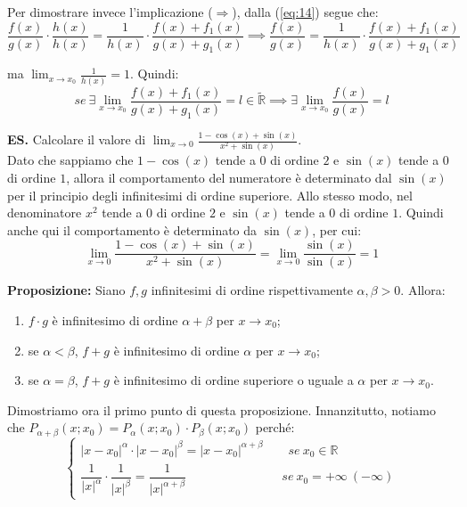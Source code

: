 \documentclass{article}
\begin{document}
\noindent Per dimostrare invece l'implicazione ($\Rightarrow$), dalla (\ref{eq:14}) segue che:
\begin{equation*}
    \frac{f(x)}{g(x)} \cdot \frac{h(x)}{h(x)} = \frac{1}{h(x)} \cdot \frac{f(x) + f_1(x)}{g(x) + g_1(x)} \implies \frac{f(x)}{g(x)} = \frac{1}{h(x)} \cdot \frac{f(x) + f_1(x)}{g(x) + g_1(x)}
\end{equation*}

\noindent ma $\lim_{x \to x_0} \frac{1}{h(x)} = 1$. Quindi:
\begin{equation*}
    se \ \exists \lim_{x \to x_0} \frac{f(x) + f_1(x)}{g(x) + g_1(x)} = l \in \widetilde{\mathbb{R}} \implies \exists \lim_{x \to x_0} \frac{f(x)}{g(x)} = l
\end{equation*}

\noindent\textbf{ES.} Calcolare il valore di $\lim_{x \to 0} \frac{1 - \cos(x) + \sin(x)}{x^2 + \sin(x)}$.\\
Dato che sappiamo che $1 - \cos(x)$ tende a $0$ di ordine $2$ e $\sin(x)$ tende a $0$ di ordine $1$, allora il comportamento del numeratore è determinato dal $\sin(x)$ per il principio degli infinitesimi di ordine superiore. Allo stesso modo, nel denominatore $x^2$ tende a $0$ di ordine $2$ e $\sin(x)$ tende a $0$ di ordine $1$. Quindi anche qui il comportamento è determinato da $\sin(x)$, per cui:
\begin{equation*}
    \lim_{x \to 0} \frac{1 - \cos(x) + \sin(x)}{x^2 + \sin(x)} = \lim_{x \to 0} \frac{\sin(x)}{\sin(x)} = 1
\end{equation*}

\noindent\textbf{Proposizione:} Siano $f, g$ infinitesimi di ordine rispettivamente $\alpha, \beta > 0$. Allora:
\begin{enumerate}
    \item $f \cdot g$ è infinitesimo di ordine $\alpha + \beta$ per $x \to x_0$;
    \item se $\alpha < \beta$, $f + g$ è infinitesimo di ordine $\alpha$ per $x \to x_0$;
    \item se $\alpha = \beta$, $f + g$ è infinitesimo di ordine superiore o uguale a $\alpha$ per $x \to x_0$.
\end{enumerate}

\noindent Dimostriamo ora il primo punto di questa proposizione. Innanzitutto, notiamo che $P_{\alpha + \beta}(x; x_0) = P_\alpha(x;x_0) \cdot P_\beta(x;x_0)$ perché:
\begin{equation*}
    \begin{cases}
        |x - x_0|^\alpha \cdot |x - x_0|^\beta = |x - x_0|^{\alpha + \beta} \qquad se \ x_0 \in \mathbb{R} \\
        \dfrac{1}{|x|^\alpha} \cdot \dfrac{1}{|x|^\beta} = \dfrac{1}{|x|^{\alpha + \beta}} \qquad \qquad \qquad \quad \ \ \ se \ x_0 = + \infty \ (-\infty)
    \end{cases}
\end{equation*}
\end{document}
